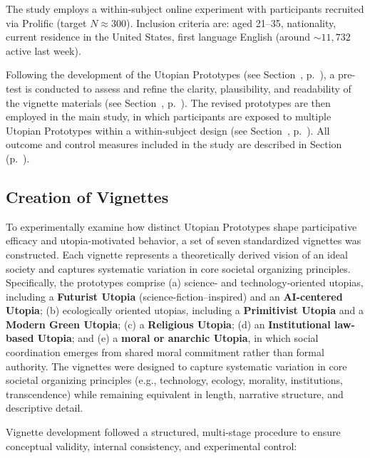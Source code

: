 \documentclass[jou,floatsintext]{apa7}
\begin{document}
The study employs a within-subject online experiment with participants recruited via Prolific (target $N \approx 300$). Inclusion criteria are: aged 21--35, nationality, current residence in the United States, first language English (around $\sim 11,732$ active last week).

Following the development of the Utopian Prototypes (see Section~, p.~\pageref{sec:vignettes}), a pre-test is conducted to assess and refine the clarity, plausibility, and readability of the vignette materials (see Section~, p.~\pageref{sec:pretest}). The revised prototypes are then employed in the main study, in which participants are exposed to multiple Utopian Prototypes within a within-subject design (see Section~, p.~\pageref{sec:mainstudy}). All outcome and control measures included in the study are described in Section~ (p.~\pageref{sec:measures}).


\subsection{Creation of Vignettes}
\label{sec:vignettes}

To experimentally examine how distinct Utopian Prototypes shape participative efficacy and utopia-motivated behavior, a set of seven standardized vignettes was constructed. Each vignette represents a theoretically derived vision of an ideal society and captures systematic variation in core societal organizing principles. Specifically, the prototypes comprise (a) science- and technology-oriented utopias, including a \textbf{Futurist Utopia} (science-fiction–inspired) and an \textbf{AI-centered Utopia}; (b) ecologically oriented utopias, including a \textbf{Primitivist Utopia} and a \textbf{Modern Green Utopia}; (c) a \textbf{Religious Utopia}; (d) an \textbf{Institutional law-based Utopia}; and (e) a \textbf{moral or anarchic Utopia}, in which social coordination emerges from shared moral commitment rather than formal authority. The vignettes were designed to capture systematic variation in core societal organizing principles (e.g., technology, ecology, morality, institutions, transcendence) while remaining equivalent in length, narrative structure, and descriptive detail.

Vignette development followed a structured, multi-stage procedure to ensure conceptual validity, internal consistency, and experimental control:
\end{document}
